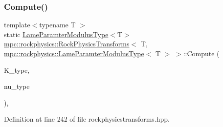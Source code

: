 \subsubsection{\texorpdfstring{Compute()}{Compute()}\hspace{0.1cm}{\footnotesize\ttfamily [5/7]}}
{\footnotesize\ttfamily template$<$typename T $>$ \\
static \mbox{\hyperlink{structmpc_1_1rockphysics_1_1_lame_paramter_modulus_type}{Lame\+Paramter\+Modulus\+Type}}$<$T$>$ \mbox{\hyperlink{structmpc_1_1rockphysics_1_1_rock_physics_transforms}{mpc\+::rockphysics\+::\+Rock\+Physics\+Transforms}}$<$ T, \mbox{\hyperlink{structmpc_1_1rockphysics_1_1_lame_paramter_modulus_type}{mpc\+::rockphysics\+::\+Lame\+Paramter\+Modulus\+Type}}$<$ T $>$ $>$\+::Compute (\begin{DoxyParamCaption}\item[{const \mbox{\hyperlink{structmpc_1_1rockphysics_1_1_bulk_modulus_type}{mpc\+::rockphysics\+::\+Bulk\+Modulus\+Type}}$<$ T $>$ \&}]{K\+\_\+type,  }\item[{const \mbox{\hyperlink{structmpc_1_1rockphysics_1_1_poissons_ratio_type}{mpc\+::rockphysics\+::\+Poissons\+Ratio\+Type}}$<$ T $>$ \&}]{nu\+\_\+type }\end{DoxyParamCaption})\hspace{0.3cm}{\ttfamily [inline]}, {\ttfamily [static]}}



Definition at line 242 of file rockphysicstransforms.\+hpp.

\mbox{\label{structmpc_1_1rockphysics_1_1_rock_physics_transforms_3_01_t_00_01mpc_1_1rockphysics_1_1_lame_para5e1496021e3962f82419b3f52eb8942_aff263f00bac2fc503336ebb19f160db4}} 
